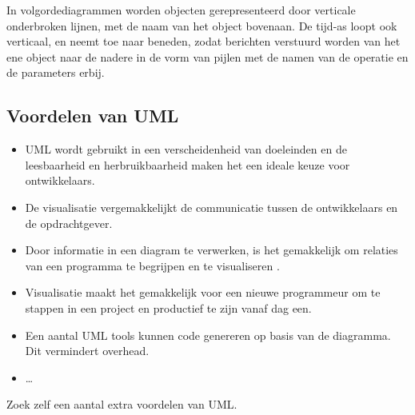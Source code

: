 In volgordediagrammen worden objecten gerepresenteerd door verticale onderbroken lijnen, met de naam van het object bovenaan. De tijd-as loopt ook verticaal, en neemt toe naar beneden, zodat berichten verstuurd worden van het ene object naar de nadere in de vorm van pijlen met de namen van de operatie en de parameters erbij. 

\subsection{Voordelen van UML}
\begin{itemize}
	\item UML wordt gebruikt in een verscheidenheid van doeleinden en de leesbaarheid en herbruikbaarheid maken het een ideale keuze voor ontwikkelaars.
	\item De visualisatie vergemakkelijkt de communicatie tussen de ontwikkelaars en de opdrachtgever.
	\item Door informatie in een diagram te verwerken, is het gemakkelijk om relaties van een programma te begrijpen en te visualiseren . 
	\item Visualisatie maakt het gemakkelijk voor een nieuwe programmeur om te stappen in een project en productief te zijn vanaf dag een. 
	\item  Een aantal UML tools kunnen code genereren op basis van de diagramma. Dit vermindert overhead.
	\item \dots
\end{itemize}

\begin{exercise}
	Zoek zelf een aantal extra voordelen van UML.
\end{exercise}

